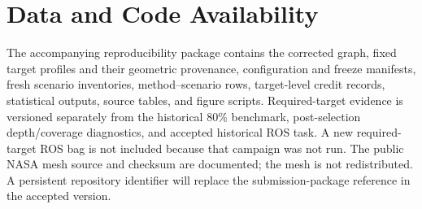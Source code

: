 \section*{Data and Code Availability}

The accompanying reproducibility package contains the corrected graph, fixed target profiles and their geometric provenance, configuration and freeze manifests, fresh scenario inventories, method--scenario rows, target-level credit records, statistical outputs, source tables, and figure scripts. Required-target evidence is versioned separately from the historical 80\% benchmark, post-selection depth/coverage diagnostics, and accepted historical ROS task. A new required-target ROS bag is not included because that campaign was not run. The public NASA mesh source and checksum are documented; the mesh is not redistributed. A persistent repository identifier will replace the submission-package reference in the accepted version.
